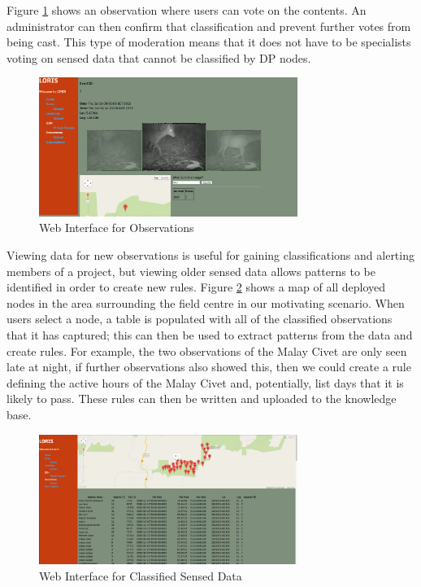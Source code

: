 		Figure \ref{kc:loris} shows an observation where users can vote on the contents. An administrator can then confirm that classification and prevent further votes from being cast. This type of moderation means that it does not have to be specialists voting on sensed data that cannot be classified by DP nodes.
		
		\begin{figure}[h]
		\centering
		\includegraphics[width=0.75\textwidth]{Chap4/figures/loris}
		\caption{Web Interface for Observations}
		\label{kc:loris}
		\end{figure}
		
		Viewing data for new observations is useful for gaining classifications and alerting members of a project, but viewing older sensed data allows patterns to be identified in order to create new rules. Figure \ref{kc:loris_data} shows a map of all deployed nodes in the area surrounding the field centre in our motivating scenario. When users select a node, a table is populated with all of the classified observations that it has captured; this can then be used to extract patterns from the data and create rules. For example, the two observations of the Malay Civet are only seen late at night, if further observations also showed this, then we could create a rule defining the active hours of the Malay Civet and, potentially, list days that it is likely to pass. These rules can then be written and uploaded to the knowledge base.
		\begin{figure}[h]
		\centering
		\includegraphics[width=0.75\textwidth]{Chap4/figures/loris_data}
		\caption{Web Interface for Classified Sensed Data}
		\label{kc:loris_data}
		\end{figure}

